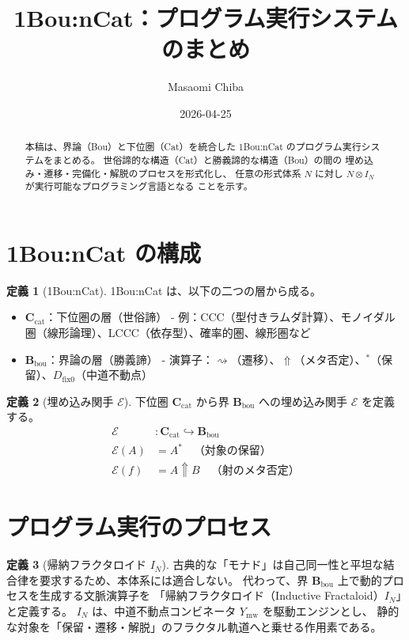 \documentclass[11pt,a4paper]{article}
\theoremstyle{definition}
\newtheorem{definition}{定義}[section]
\newcommand{\dfix}{D_{\mathrm{fix}0}} %
\newcommand{\metanegation}{\Uparrow}
\newcommand{\Cat}{\mathbf{C}_{\mathrm{cat}}}  %
\newcommand{\Bou}{\mathbf{B}_{\mathrm{bou}}}  %
\newcommand{\Leadsto}{\rightsquigarrow}
\newcommand{\susp}[1]{#1^*}
\newcommand{\Rmw}{Y_{\mathrm{mw}}}
\begin{document}
\title{1Bou:nCat：プログラム実行システムのまとめ}
\author{Masaomi Chiba}
\date{2026-04-25}
\maketitle

\begin{abstract}
本稿は、界論（Bou）と下位圏（Cat）を統合した
1Bou:nCat のプログラム実行システムをまとめる。
世俗諦的な構造（Cat）と勝義諦的な構造（Bou）の間の
埋め込み・遷移・完備化・解脱のプロセスを形式化し、
任意の形式体系 $N$ に対し $N \otimes I_N$ が実行可能なプログラミング言語となる
ことを示す。
\end{abstract}

\section{1Bou:nCat の構成}

\begin{definition}[1Bou:nCat]
1Bou:nCat は、以下の二つの層から成る。
\begin{itemize}
\item $\Cat$：下位圏の層（世俗諦）  
  - 例：CCC（型付きラムダ計算）、モノイダル圏（線形論理）、LCCC（依存型）、確率的圏、線形圏など
\item $\Bou$：界論の層（勝義諦）  
  - 演算子：$\Leadsto$（遷移）、$\metanegation$（メタ否定）、$\susp{}$（保留）、$\dfix$（中道不動点）
\end{itemize}
\end{definition}

\begin{definition}[埋め込み関手 $\mathcal{E}$]
下位圏 $\Cat$ から界 $\Bou$ への埋め込み関手 $\mathcal{E}$ を定義する。
\begin{align*}
\mathcal{E} &: \Cat \hookrightarrow \Bou \\
\mathcal{E}(A) &= \susp{A} \quad\text{（対象の保留）} \\
\mathcal{E}(f) &= A \metanegation B \quad\text{（射のメタ否定）}
\end{align*}
\end{definition}

\section{プログラム実行のプロセス}

\begin{definition}[帰納フラクタロイド $I_N$]
古典的な「モナド」は自己同一性と平坦な結合律を要求するため、本体系には適合しない。
代わって、界 $\Bou$ 上で動的プロセスを生成する文脈演算子を
「帰納フラクタロイド（Inductive Fractaloid）$I_N$」と定義する。
$I_N$ は、中道不動点コンビネータ $\Rmw$ を駆動エンジンとし、
静的な対象を「保留・遷移・解脱」のフラクタル軌道へと乗せる作用素である。
\end{definition}
\end{document}
